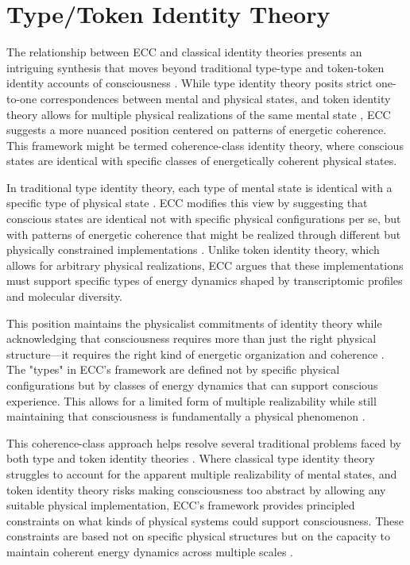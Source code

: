 \section{Type/Token Identity Theory}

The relationship between ECC and classical identity theories presents an intriguing synthesis that moves beyond traditional type-type and token-token identity accounts of consciousness \cite{polger2009evaluating}. While type identity theory posits strict one-to-one correspondences between mental and physical states, and token identity theory allows for multiple physical realizations of the same mental state \cite{bechtel1999multiple}, ECC suggests a more nuanced position centered on patterns of energetic coherence. This framework might be termed coherence-class identity theory, where conscious states are identical with specific classes of energetically coherent physical states.

In traditional type identity theory, each type of mental state is identical with a specific type of physical state \cite{place1956is}. ECC modifies this view by suggesting that conscious states are identical not with specific physical configurations per se, but with patterns of energetic coherence that might be realized through different but physically constrained implementations \cite{shapiro2000multiple}. Unlike token identity theory, which allows for arbitrary physical realizations, ECC argues that these implementations must support specific types of energy dynamics shaped by transcriptomic profiles and molecular diversity.

This position maintains the physicalist commitments of identity theory while acknowledging that consciousness requires more than just the right physical structure—it requires the right kind of energetic organization and coherence \cite{richardson2008multiple}. The "types" in ECC's framework are defined not by specific physical configurations but by classes of energy dynamics that can support conscious experience. This allows for a limited form of multiple realizability while still maintaining that consciousness is fundamentally a physical phenomenon \cite{kim1992multiple}.

This coherence-class approach helps resolve several traditional problems faced by both type and token identity theories \cite{lewis1966argument}. Where classical type identity theory struggles to account for the apparent multiple realizability of mental states, and token identity theory risks making consciousness too abstract by allowing any suitable physical implementation, ECC's framework provides principled constraints on what kinds of physical systems could support consciousness. These constraints are based not on specific physical structures but on the capacity to maintain coherent energy dynamics across multiple scales \cite{wilson2001two}.

